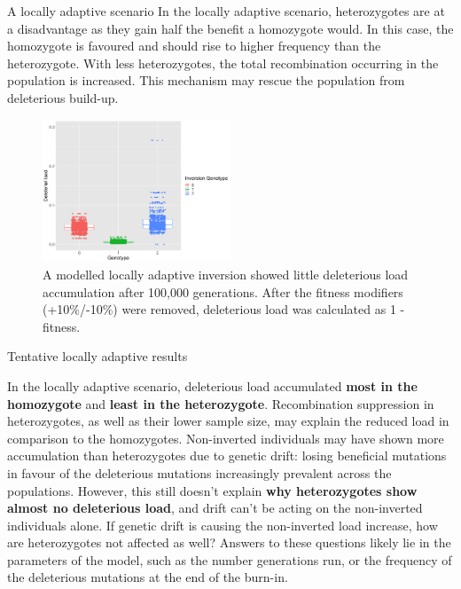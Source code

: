 \documentclass[final]{beamer}
\newlength{\colwidth}
\begin{document}
\begin{frame}[t]
\begin{columns}[t]
\begin{column}{\colwidth}
\begin{block}{A locally adaptive scenario}
        In the locally adaptive scenario, heterozygotes are at a disadvantage as they gain half the benefit a homozygote would. In this case, the homozygote is favoured and should rise to higher frequency than the heterozygote. With less heterozygotes, the total recombination occurring in the population is increased. This mechanism may rescue the population from deleterious build-up.
    
        \begin{figure}
        \centering
                        \includegraphics[width=0.5\textwidth]{figures/la_load_100kgen.png}
        \caption{A modelled locally adaptive inversion showed little deleterious load accumulation after 100,000 generations. After the fitness modifiers (+10\%/-10\%) were removed, deleterious load was calculated as 1 - fitness. }
        \end{figure}

    \end{block}
    \begin{exampleblock}{Tentative locally adaptive results}

        In the locally adaptive scenario, deleterious load accumulated \textbf{most in the homozygote} and \textbf{least in the heterozygote}. Recombination suppression in heterozygotes, as well as their lower sample size, may explain the reduced load in comparison to the homozygotes. Non-inverted individuals may have shown more accumulation than heterozygotes due to genetic drift: losing beneficial mutations in favour of the deleterious mutations increasingly prevalent across the populations. However, this still doesn't explain \textbf{why heterozygotes show almost no deleterious load}, and drift can't be acting on the non-inverted individuals alone. If genetic drift is causing the non-inverted load increase, how are heterozygotes not affected as well? Answers to these questions likely lie in the parameters of the model, such as the number generations run, or the frequency of the deleterious mutations at the end of the burn-in.


\end{exampleblock}
\end{column}
\end{columns}
\end{frame}
\end{document}
